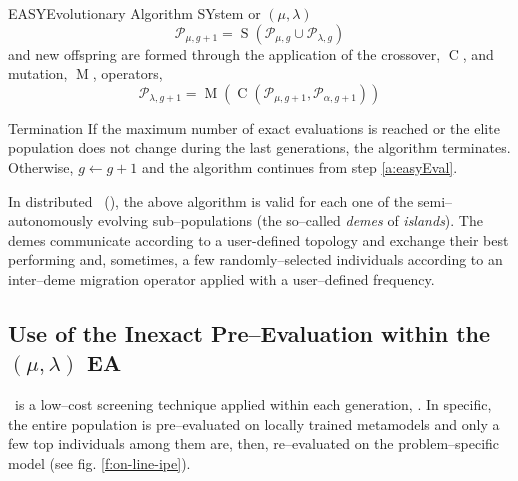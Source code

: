 \documentclass{vki_ls}
\newcommand{\set}[1]{\mathcal{#1}}
\newcommand{\op}[1]{\mathop{#1}}
\newcommand{\assign}{\leftarrow}
\begin{document}
\begin{namedalgorithm}{EASY}{Evolutionary Algorithm SYstem or $(\mu, \lambda)$ \EA}{}
%
\begin{equation}
    \set{P}_{\mu,g+1} = \op{S}(\set{P}_{\mu,g} \cup
    \set{P}_{\lambda,g})
    \nonumber
\end{equation}
%
and new offspring are formed through the application of the crossover, $\op{C}$, and mutation, $\op{M}$, operators,
%
\begin{equation}
    \set{P}_{\lambda,g+1} = \op{M}(\op{C}(\set{P}_{\mu,g+1},
    \set{P}_{\alpha,g+1}))
    \nonumber
\end{equation}
%
\item[Termination] \label{a:easyTermin}
If the maximum number of exact evaluations is reached or the elite population does not change during the last generations, the algorithm terminates. 
Otherwise, $g\!\assign\!g\!+\!1$ and the algorithm continues from step \ref{a:easyEval}.
\end{namedalgorithm}

In distributed \EAs\ (\DEAs), the above algorithm is valid for each one of the semi--autonomously evolving sub--populations (the so--called \textit{demes} of \textit{islands}). 
The demes communicate according to a user-defined topology and exchange their best performing and, sometimes, a few randomly--selected individuals according to an inter--deme migration operator applied with a user--defined frequency. 

\subsection[Use of the Inexact Pre--Evaluation within the $(\mu, \lambda)$ EA]
{Use of the Inexact Pre--Evaluation within the $(\mu, \lambda)$ EA}
\label{ss:ipe}

\IPE\ is a low--cost screening technique applied within each generation, 
\cite{LTT_3_054, LTT_2_029}.
In specific, the entire population is pre--evaluated on locally trained metamodels and only a few top individuals among them are, then, re--evaluated on the problem--specific model (see fig. \ref{f:on-line-ipe}).
\end{document}
